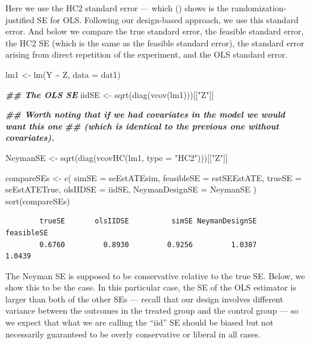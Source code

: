 \documentclass[
  12pt,
]{book}
\newenvironment{Shaded}{\begin{snugshade}}{\end{snugshade}}
\newcommand{\AttributeTok}[1]{\textcolor[rgb]{0.77,0.63,0.00}{#1}}
\newcommand{\DocumentationTok}[1]{\textcolor[rgb]{0.56,0.35,0.01}{\textbf{\textit{#1}}}}
\newcommand{\FunctionTok}[1]{\textcolor[rgb]{0.00,0.00,0.00}{#1}}
\newcommand{\NormalTok}[1]{#1}
\newcommand{\OtherTok}[1]{\textcolor[rgb]{0.56,0.35,0.01}{#1}}
\newcommand{\SpecialCharTok}[1]{\textcolor[rgb]{0.00,0.00,0.00}{#1}}
\newcommand{\StringTok}[1]{\textcolor[rgb]{0.31,0.60,0.02}{#1}}
\theoremstyle{definition}
\theoremstyle{definition}
\theoremstyle{definition}
\theoremstyle{remark}
\begin{document}
Here we use the HC2 standard error --- which (\citet{lin_agnostic_2013})
shows is the randomization-justified SE for OLS. Following our
design-based approach, we use this standard error. And below we compare
the true standard error, the feasible standard error, the HC2 SE (which
is the same as the feasible standard error), the standard error arising
from direct repetition of the experiment, and the OLS standard error.

\begin{Shaded}
\begin{Highlighting}[]
\NormalTok{lm1 }\OtherTok{\textless{}{-}} \FunctionTok{lm}\NormalTok{(Y }\SpecialCharTok{\textasciitilde{}}\NormalTok{ Z, }\AttributeTok{data =}\NormalTok{ dat1)}

\DocumentationTok{\#\# The OLS SE}
\NormalTok{iidSE }\OtherTok{\textless{}{-}} \FunctionTok{sqrt}\NormalTok{(}\FunctionTok{diag}\NormalTok{(}\FunctionTok{vcov}\NormalTok{(lm1)))[[}\StringTok{"Z"}\NormalTok{]]}

\DocumentationTok{\#\# Worth noting that if we had covariates in the model we would want this one}
\DocumentationTok{\#\# (which is identical to the previous one without covariates).}

\NormalTok{NeymanSE }\OtherTok{\textless{}{-}} \FunctionTok{sqrt}\NormalTok{(}\FunctionTok{diag}\NormalTok{(}\FunctionTok{vcovHC}\NormalTok{(lm1, }\AttributeTok{type =} \StringTok{"HC2"}\NormalTok{)))[[}\StringTok{"Z"}\NormalTok{]]}

\NormalTok{compareSEs }\OtherTok{\textless{}{-}} \FunctionTok{c}\NormalTok{(}
  \AttributeTok{simSE =}\NormalTok{ seEstATEsim,}
  \AttributeTok{feasibleSE =}\NormalTok{ estSEEstATE,}
  \AttributeTok{trueSE =}\NormalTok{ seEstATETrue,}
  \AttributeTok{olsIIDSE =}\NormalTok{ iidSE,}
  \AttributeTok{NeymanDesignSE =}\NormalTok{ NeymanSE}
\NormalTok{)}
\FunctionTok{sort}\NormalTok{(compareSEs)}
\end{Highlighting}
\end{Shaded}

\begin{verbatim}
        trueSE       olsIIDSE          simSE NeymanDesignSE     feasibleSE 
        0.6760         0.8930         0.9256         1.0387         1.0439 
\end{verbatim}

The Neyman SE is supposed to be conservative relative to the true SE.
Below, we show this to be the case. In this particular case, the SE of
the OLS estimator is larger than both of the other SEs --- recall that
our design involves different variance between the outcomes in the
treated group and the control group --- so we expect that what we are
calling the ``iid'' SE should be biased but not necessarily guaranteed
to be overly conservative or liberal in all cases.
\end{document}
